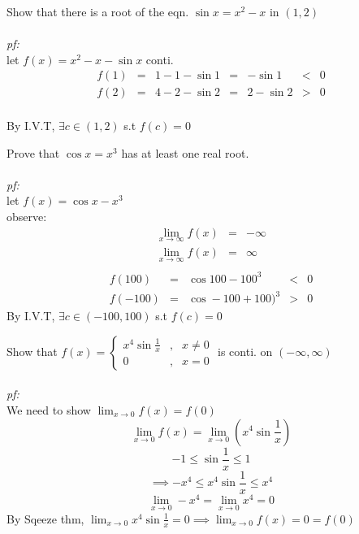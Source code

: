 \begin{eg}
Show that there is a root of the eqn. $\sin x = x^2 - x$ in $(1, 2)$\\\\
\textit{pf:}\\
let $f(x) = x^2 -x - \sin x$ conti.\\
$$\begin{array}{rcccccl}
f(1) & = & 1 - 1 - \sin 1 & = & -\sin 1 & < & 0\\
f(2) & = & 4 - 2 - \sin 2 & = & 2 - \sin 2 & > & 0
\end{array}$$\\
By I.V.T, $\exists c \in (1, 2)$ s.t $f(c) = 0$
\end{eg}
\begin{eg}
Prove that $\cos x = x^3$ has at least one real root.\\\\
\textit{pf:}\\
let $f(x)= \cos x - x^3$\\
observe:
$$\begin{array}{rcl}
\displaystyle \lim_{x \to \infty} f(x) & = & - \infty\\
\displaystyle \lim_{x \to \infty} f(x) & = & \infty\\
\end{array}$$
$$\begin{array}{rcccl}
f(100) & = & \cos 100 - 100^3 & < & 0\\
f(-100) & = & \cos -100 + 100)^3 & > & 0
\end{array}$$
By I.V.T, $\exists c \in (-100, 100)$ s.t $f(c) = 0$
\end{eg}
\begin{eg}
Show that $f(x) = \left \{ \begin{array}{ccl}
x^4 \sin \frac{1}{x} & \mbox{,} & x \neq 0\\
0 & \mbox{,} & x = 0
\end{array}\right.$ is conti. on $(- \infty, \infty)$\\\\
\textit{pf:}\\
We need to show $\displaystyle \lim_{x \to 0} f(x) = f(0)$\\
$$\displaystyle \lim_{x \to 0} f(x) = \lim_{x \to 0} (x^4 \sin \frac{1}{x})$$
$$\displaystyle -1 \leq \sin \frac{1}{x} \leq 1$$
$$\displaystyle \implies -x^4 \leq x^4 \sin \frac{1}{x} \leq x^4$$
$$\displaystyle \lim_{x \to 0} -x^4 = \lim_{x \to 0} x^4 = 0$$
By Sqeeze thm, $\displaystyle \lim_{x \to 0} x^4 \sin \frac{1}{x} = 0 \implies \lim_{x \to 0} f(x) = 0 = f(0)$
\end{eg}
